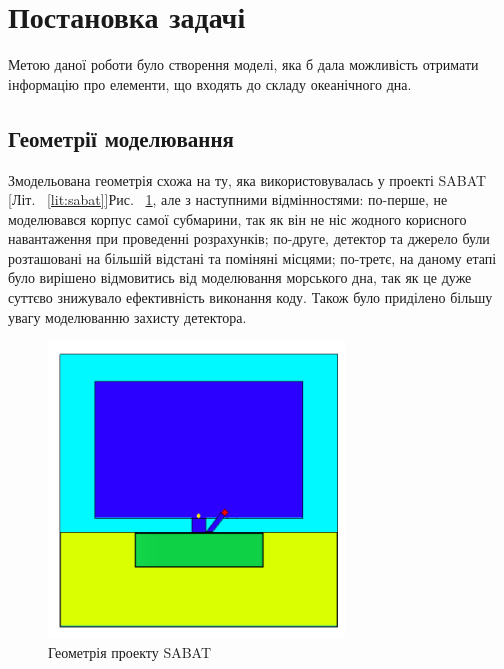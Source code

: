 \documentclass[a4paper, 14pt]{article}
\numberwithin{equation}{section}
\numberwithin{table}{section}
\begin{document}
\section{Постановка задачі}
\setcounter{figure}{0}
Метою даної роботи було створення моделі, яка б дала можливість отримати інформацію про елементи, що входять до складу океанічного дна.
\subsection {Геометрії моделювання}
Змодельована геометрія схожа на ту, яка використовувалась у проекті SABAT [Літ. ~\ref{lit:sabat}]Рис. ~\ref{ris:SabatG}, але з наступними відмінностями: по-перше, не моделювався корпус самої субмарини, так як він не ніс жодного корисного навантаження при проведенні розрахунків; по-друге, детектор та джерело були розташовані на більшій відстані та поміняні місцями; по-третє, на даному етапі було вирішено відмовитись від моделювання морського дна, так як це дуже суттєво знижувало ефективність виконання коду. Також було приділено більшу увагу моделюванню захисту детектора.
\begin{figure}[!hbt]
	\centering \includegraphics[width=0.7\textwidth]{images/sabatGeometry.png}
	\caption{Геометрія проекту SABAT} 
	\label{ris:SabatG}	
\end{figure}
\end{document}

